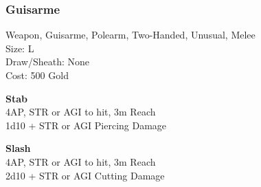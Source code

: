 \subsubsection{Guisarme}\label{weapon:guisarme}
Weapon, Guisarme, Polearm, Two-Handed, Unusual, Melee\\
Size: L\\
Draw/Sheath: None\\
Cost: 500 Gold

\textbf{Stab}\\
4AP, STR or AGI to hit, 3m Reach\\
1d10 + \texttimes STR or AGI Piercing Damage

\textbf{Slash}\\
4AP, STR or AGI to hit, 3m Reach\\
2d10 + \texttimes STR or AGI Cutting Damage
